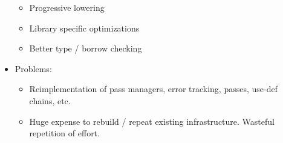 \documentclass{beamer}
\begin{document}
\begin{frame}
\begin{columns}
\begin{column}{0.6\textwidth}
\begin{itemize}
\begin{itemize}
            \item Progressive lowering
            \item Library specific optimizations
            \item Better type / borrow checking            
          \end{itemize}
        \item Problems:
        \begin{itemize}
          \footnotesize
          \itemsep0.4em
          \item Reimplementation of pass managers, error tracking, passes, use-def chains, etc.
          \item Huge expense to rebuild / repeat existing infrastructure. Wasteful repetition of effort.          
        \end{itemize}
      \end{itemize}
    \end{column}
  \end{columns}
\end{frame}
\end{document}
